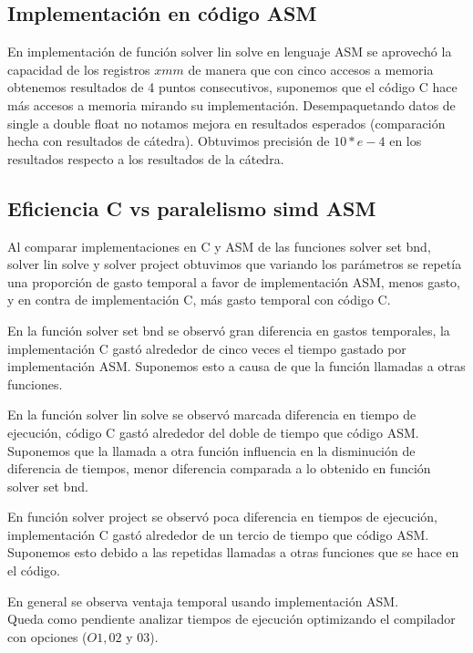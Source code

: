 
\subsection{Implementación en código ASM}
\par En implementación de función solver lin solve en lenguaje ASM se aprovechó la capacidad de los registros $xmm$ de manera que con cinco accesos a memoria obtenemos resultados de 4 puntos consecutivos, suponemos que el código C hace más accesos a memoria mirando su implementación. Desempaquetando datos de single a double float no notamos mejora en resultados esperados (comparación hecha con resultados de cátedra). Obtuvimos precisión de $10*e-4$ en los resultados respecto a los resultados de la cátedra. 

\subsection{Eficiencia C vs paralelismo simd ASM}
Al comparar implementaciones en C y ASM de las funciones solver set bnd, solver lin solve y solver project obtuvimos que variando los parámetros se repetía una proporción de gasto temporal a favor de implementación ASM, menos gasto, y en contra de implementación C, más gasto temporal con código C. 
\par En la función solver set bnd se observó gran diferencia en gastos temporales, la implementación C gastó alrededor de cinco veces el tiempo gastado por implementación ASM. Suponemos esto a causa de que la función llamadas a otras funciones.
\par En la función solver lin solve se observó marcada diferencia en tiempo de ejecución, código C gastó alrededor del doble de tiempo que código ASM. Suponemos que la llamada a otra función influencia en la disminución de diferencia de tiempos, menor diferencia comparada a lo obtenido en función solver set bnd.
\par En función solver project se observó poca diferencia en tiempos de ejecución, implementación C gastó alrededor de un tercio de tiempo que código ASM. Suponemos esto debido a las repetidas llamadas a otras funciones que se hace en el código.
\par En general se observa ventaja temporal usando implementación ASM.\\

Queda como pendiente analizar tiempos de ejecución optimizando el compilador con opciones ($O1, 02$ y $03$).
